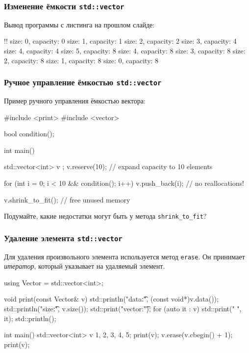 \documentclass[compress, 8pt]{beamer}
\begin{document}
  \begin{frame}[fragile]

    \frametitle{Изменение ёмкости \texttt{std::vector}}

    Вывод программы с листинга на прошлом слайде:

    \begin{terminalwindow}
!!
size: 0, capacity: 0
size: 1, capacity: 1
size: 2, capacity: 2
size: 3, capacity: 4
size: 4, capacity: 4
size: 5, capacity: 8
size: 4, capacity: 8
size: 3, capacity: 8
size: 2, capacity: 8
size: 1, capacity: 8
size: 0, capacity: 8
    \end{terminalwindow}

  \end{frame}

  \begin{frame}[fragile]

    \frametitle{Ручное управление ёмкостью \texttt{std::vector}}

    Пример ручного управления ёмкостью вектора:

    \begin{mycppinplacelisting}
#include <print>
#include <vector>

bool condition();

int main() {
    std::vector<int> v {};
    v.reserve(10); // expand capacity to 10 elements

    for (int i = 0; i < 10 && condition(); i++) {
        v.push_back(i); // no reallocations!
    }

    v.shrink_to_fit(); // free unused memory
}
    \end{mycppinplacelisting}

    \begin{task}
      Подумайте, какие недостатки могут быть у метода \verb|shrink_to_fit|?
    \end{task}

  \end{frame}

  \begin{frame}[fragile]

    \frametitle{Удаление элемента \texttt{std::vector}}

    Для удаления произвольного элемента используется метод
    \texttt{erase}.
    Он принимает \textit{итератор}\footnotemark{}, который
    указывает на удаляемый элемент.


    \begin{mycppinplacelisting}
using Vector = std::vector<int>;

void print(const Vector& v) {
    std::println("data:\t{}", (const void*){v.data()});
    std::println("size:\t{}", v.size());
    std::print("vector:\t");
    for (auto it : v) { std::print("{} ", it); }
    std::println();
}

int main() {
    std::vector<int> v {1, 2, 3, 4, 5};
    print(v);
    v.erase(v.cbegin() + 1);
    print(v);
}
    \end{mycppinplacelisting}

  \end{frame}
\end{document}
